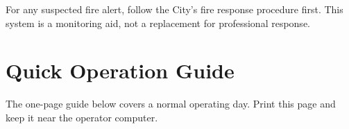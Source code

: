 \documentclass[11pt,letterpaper]{article}
\begin{document}
\begin{warnbox}
For any suspected fire alert, follow the City's fire response procedure
first. This system is a monitoring aid, not a replacement for professional
response.
\end{warnbox}

\newpage
\section{Quick Operation Guide}
\label{sec:checklist}

The one-page guide below covers a normal operating day. Print this page and
keep it near the operator computer.
\end{document}
